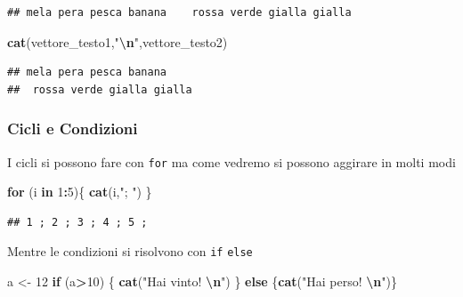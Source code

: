 \documentclass[
  11pt,
]{book}
\newenvironment{Shaded}{\begin{snugshade}}{\end{snugshade}}
\newcommand{\ControlFlowTok}[1]{\textcolor[rgb]{0.13,0.29,0.53}{\textbf{#1}}}
\newcommand{\DecValTok}[1]{\textcolor[rgb]{0.00,0.00,0.81}{#1}}
\newcommand{\FunctionTok}[1]{\textcolor[rgb]{0.13,0.29,0.53}{\textbf{#1}}}
\newcommand{\NormalTok}[1]{#1}
\newcommand{\OtherTok}[1]{\textcolor[rgb]{0.56,0.35,0.01}{#1}}
\newcommand{\SpecialCharTok}[1]{\textcolor[rgb]{0.81,0.36,0.00}{\textbf{#1}}}
\newcommand{\StringTok}[1]{\textcolor[rgb]{0.31,0.60,0.02}{#1}}
\theoremstyle{mytheoremstyle}
\theoremstyle{mydefstyle}
\begin{document}
\begin{verbatim}
## mela pera pesca banana    rossa verde gialla gialla
\end{verbatim}

\begin{Shaded}
\begin{Highlighting}[]
\FunctionTok{cat}\NormalTok{(vettore\_testo1,}\StringTok{"}\SpecialCharTok{\textbackslash{}n}\StringTok{"}\NormalTok{,vettore\_testo2)}
\end{Highlighting}
\end{Shaded}

\begin{verbatim}
## mela pera pesca banana 
##  rossa verde gialla gialla
\end{verbatim}

\subsubsection{Cicli e Condizioni}\label{cicli-e-condizioni}

I cicli si possono fare con \texttt{for} ma come vedremo si possono aggirare in molti modi

\begin{Shaded}
\begin{Highlighting}[]
\ControlFlowTok{for}\NormalTok{ (i }\ControlFlowTok{in} \DecValTok{1}\SpecialCharTok{:}\DecValTok{5}\NormalTok{)\{}
  \FunctionTok{cat}\NormalTok{(i,}\StringTok{"; "}\NormalTok{)}
\NormalTok{\}}
\end{Highlighting}
\end{Shaded}

\begin{verbatim}
## 1 ; 2 ; 3 ; 4 ; 5 ;
\end{verbatim}

Mentre le condizioni si risolvono con \texttt{if} \texttt{else}

\begin{Shaded}
\begin{Highlighting}[]
\NormalTok{a }\OtherTok{\textless{}{-}} \DecValTok{12}
\ControlFlowTok{if}\NormalTok{ (a}\SpecialCharTok{\textgreater{}}\DecValTok{10}\NormalTok{) \{}
  \FunctionTok{cat}\NormalTok{(}\StringTok{"Hai vinto! }\SpecialCharTok{\textbackslash{}n}\StringTok{"}\NormalTok{)}
\NormalTok{\} }\ControlFlowTok{else}\NormalTok{ \{}\FunctionTok{cat}\NormalTok{(}\StringTok{"Hai perso! }\SpecialCharTok{\textbackslash{}n}\StringTok{"}\NormalTok{)\}}
\end{Highlighting}
\end{Shaded}
\end{document}
